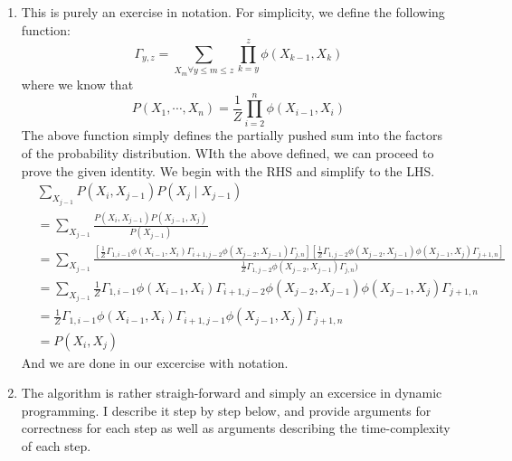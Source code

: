 \documentclass[12pt]{article}
\begin{document}
\begin{enumerate}[label=(\alph*)]
  \item This is purely an exercise in notation. For simplicity, we define the following function:
  $$
  	\Gamma_{y,z} = \sum_{X_m \forall y \leq m \leq z } \prod_{k=y}^z \phi(X_{k-1}, X_{k})
  $$
  where we know that
  $$
  	P(X_1, \cdots, X_n) = \frac{1}{Z} \prod_{i=2}^{n} \phi(X_{i-1}, X_i)
  $$
  The above function simply defines the partially pushed sum into the factors of the probability distribution. WIth the above defined, we can proceed to prove the given identity. We begin with the RHS and simplify to the LHS.
  \begin{align*}
  	&\sum_{X_{j-1}} P(X_i, X_{j-1})P(X_j \mid X_{j-1}) \\
  	&= \sum_{X_{j-1}} \frac{P(X_{i}, X_{j-1})P(X_{j-1}, X_j)}{P(X_{j-1})} \tag{Bayes Rule} \\
  	&= \sum_{X_{j-1}} \frac{\left[\frac{1}{Z} \Gamma_{1, i-1} \phi(X_{i-1}, X_{i}) \Gamma_{i + 1, j-2} \phi(X_{j-2}, X_{j-1}) \Gamma_{j, n}\right]\left[\frac{1}{Z}\Gamma_{1, j-2} \phi(X_{j-2}, X_{j-1})\phi(X_{j-1}, X_j)\Gamma_{j+1, n} \right] }{\frac{1}{Z}\Gamma_{1, j-2} \phi(X_{j-2}, X_{j-1}) \Gamma_{j, n})} \tag{Pushing Sums In} \\
  	&= \sum_{X_{j-1}} \frac{1}{Z}\Gamma_{1, i-1}\phi(X_{i-1}, X_i)\Gamma_{i+1, j-2}\phi(X_{j-2}, X_{j-1})\phi(X_{j-1},X_j)\Gamma_{j+1, n} \tag{Cancelling Like Terms} \\
  	&=  \frac{1}{Z}\Gamma_{1, i-1}\phi(X_{i-1}, X_i)\Gamma_{i+1, j-1}\phi(X_{j-1},X_j)\Gamma_{j+1, n} \tag{Pushing outer sum in and simplifying using $\Gamma$} \\
  	&= P(X_i, X_j) \tag{Definition of $\Gamma$ (ie, we're summing the potentials over everything except $X_i, X_j$)}
  \end{align*}
  And we are done in our excercise with notation.
  \item The algorithm is rather straigh-forward and simply an excersice in dynamic programming. I describe it step by step below, and provide arguments for correctness for each step as well as arguments describing the time-complexity of each step.


\end{enumerate}
\end{document}
